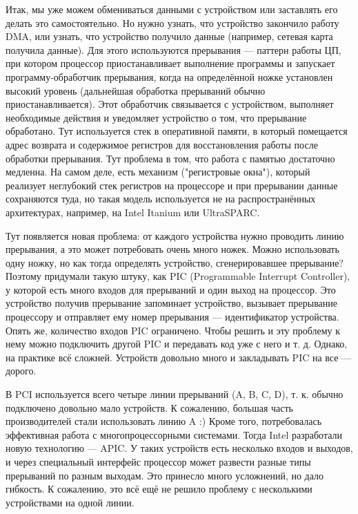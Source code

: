 \documentclass[main.tex]{subfiles}
\begin{document}
Итак, мы уже можем обмениваться данными с устройством или заставлять его
делать это самостоятельно. Но нужно узнать, что устройство закончило работу
DMA, или узнать, что устройство получило данные (например, сетевая карта
получила данные). Для этого используются прерывания --- паттерн работы
ЦП, при котором процессор приостанавливает выполнение программы и запускает
программу-обработчик прерывания, когда на определённой ножке установлен
высокий уровень (дальнейшая обработка прерываний обычно приостанавливается).
Этот обработчик связывается с устройством, выполняет необходимые действия
и уведомляет устройство о том, что прерывание обработано.
Тут используется стек в оперативной памяти, в который помещается адрес возврата и содержимое регистров
для восстановления работы после обработки прерывания. Тут проблема в том, что
работа с памятью достаточно медленна. На самом деле, есть механизм ("регистровые окна"), который
реализует неглубокий стек регистров на процессоре и при прерывании данные
сохраняются туда, но такая модель используется не на распространённых архитектурах,
например, на Intel Itanium или UltraSPARC.

Тут появляется новая проблема: от каждого устройства нужно проводить линию
прерывания, а это может потребовать очень много ножек. Можно использовать одну
ножку, но как тогда определять устройство, сгенерировавшее прерывание?
Поэтому придумали такую штуку, как PIC (Programmable Interrupt Controller), у которой есть много входов для
прерываний и один выход на процессор. Это устройство получив прерывание
запоминает устройство, вызывает прерывание процессору и отправляет ему
номер прерывания --- идентификатор устройства.
Опять же, количество входов PIC ограничено. Чтобы решить и эту проблему
к нему можно подключить другой PIC и передавать код уже с него и т. д.
Однако, на практике всё сложней. Устройств довольно много и закладывать
PIC на все --- дорого.

В PCI используется всего четыре линии прерываний (A, B, C, D), т.  к.
обычно подключено довольно мало устройств. К сожалению, большая часть
производителей стали использовать линию A :)
Кроме того, потребовалась эффективная работа с многопроцессорными системами.
Тогда Intel разработали новую технологию --- APIC. У таких устройств есть
несколько входов и выходов, и через специальный интерфейс процессор
может развести разные типы прерываний по разным выходам. Это принесло много
усложнений, но дало гибкость.
К сожалению, это всё ещё не решило проблему с несколькими устройствами
на одной линии.
\end{document}

